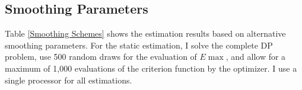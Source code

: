 \subsection{Smoothing Parameters}
Table \ref{Smoothing Schemes} shows the estimation results based on alternative smoothing parameters. For the static estimation, I solve the complete DP problem, use 500 random draws for the evaluation of $E\max$, and allow for a maximum of 1,000 evaluations of the criterion function by the optimizer. I use a single processor for all estimations.

